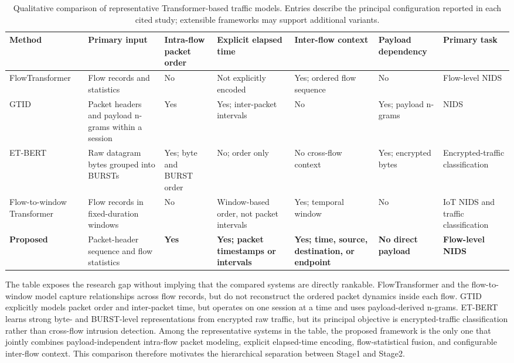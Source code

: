 \begin{table}[t]
\centering
\caption{Qualitative comparison of representative Transformer-based traffic
models. Entries describe the principal configuration reported in each cited
study; extensible frameworks may support additional variants.}
\label{tab:rw_model_comparison}
\scriptsize
\setlength{\tabcolsep}{2pt}
\renewcommand{\arraystretch}{1.22}
\begin{tabular}{@{}p{1.85cm}p{2.65cm}p{1.55cm}p{2.15cm}p{2.45cm}p{1.85cm}p{1.85cm}@{}}
\toprule
\textbf{Method} &
\textbf{Primary input} &
\textbf{Intra-flow packet order} &
\textbf{Explicit elapsed time} &
\textbf{Inter-flow context} &
\textbf{Payload dependency} &
\textbf{Primary task} \\
\midrule
FlowTransformer \cite{Manocchio2024FlowTransformer} &
Flow records and statistics &
No &
Not explicitly encoded &
Yes; ordered flow sequence &
No &
Flow-level NIDS \\

GTID \cite{Han2023GTID} &
Packet headers and payload n-grams within a session &
Yes &
Yes; inter-packet intervals &
No &
Yes; payload n-grams &
NIDS \\

ET-BERT \cite{Lin2022ETBERT} &
Raw datagram bytes grouped into BURSTs &
Yes; byte and BURST order &
No; order only &
No cross-flow context &
Yes; encrypted bytes &
Encrypted-traffic classification \\

Flow-to-window Transformer \cite{MartinReizabal2026FlowWindow} &
Flow records in fixed-duration windows &
No &
Window-based order, not packet intervals &
Yes; temporal window &
No &
IoT NIDS and traffic classification \\

\textbf{Proposed} &
Packet-header sequence and flow statistics &
\textbf{Yes} &
\textbf{Yes; packet timestamps or intervals} &
\textbf{Yes; time, source, destination, or endpoint} &
\textbf{No direct payload} &
\textbf{Flow-level NIDS} \\
\bottomrule
\end{tabular}
\end{table}

The table exposes the research gap without implying that the compared systems
are directly rankable. FlowTransformer and the flow-to-window model capture
relationships across flow records, but do not reconstruct the ordered packet
dynamics inside each flow. GTID explicitly models packet order and inter-packet
time, but operates on one session at a time and uses payload-derived n-grams.
ET-BERT learns strong byte- and BURST-level representations from encrypted raw
traffic, but its principal objective is encrypted-traffic classification rather
than cross-flow intrusion detection. Among the representative systems in the
table, the proposed framework is the only one that jointly combines
payload-independent intra-flow packet modeling, explicit elapsed-time encoding,
flow-statistical fusion, and configurable inter-flow context. This comparison
therefore motivates the hierarchical separation between Stage1 and Stage2.

